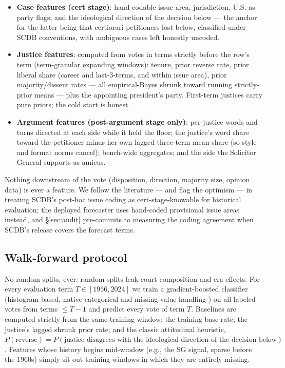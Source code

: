 \documentclass[11pt]{article}
\begin{document}
\begin{itemize}
\item \textbf{Case features (cert stage)}: hand-codable issue area,
  jurisdiction, U.S.-as-party flags, and the ideological direction of the
  decision below --- the anchor for the latter being that certiorari petitioners
  lost below, classified under SCDB conventions, with ambiguous cases left
  honestly uncoded.
\item \textbf{Justice features}: computed from votes in terms strictly before
  the row's term (term-granular expanding windows): tenure, prior reverse rate,
  prior liberal share (career and last-3-terms, and within issue area), prior
  majority/dissent rates --- all empirical-Bayes shrunk toward running
  strictly-prior means --- plus the appointing president's party. First-term
  justices carry pure priors; the cold start is honest.
\item \textbf{Argument features (post-argument stage only)}: per-justice words
  and turns directed at each side while it held the floor; the justice's word
  share toward the petitioner minus her own lagged three-term mean share (so
  style and format norms cancel); bench-wide aggregates; and the side the
  Solicitor General supports as amicus.
\end{itemize}

Nothing downstream of the vote (disposition, direction, majority size, opinion
data) is ever a feature. We follow the literature --- and flag the optimism ---
in treating SCDB's post-hoc issue coding as cert-stage-knowable for historical
evaluation; the deployed forecaster uses hand-coded provisional issue areas
instead, and \S\ref{sec:audit} pre-commits to measuring the coding agreement
when SCDB's release covers the forecast terms.

\subsection{Walk-forward protocol}

No random splits, ever: random splits leak court composition and era effects.
For every evaluation term $T \in [1956, 2024]$ we train a gradient-boosted
classifier (histogram-based, native categorical and missing-value handling
\citep{pedregosa2011}) on all labeled votes from terms $\le T{-}1$ and predict
every vote of term $T$. Baselines are computed strictly from the same training
window: the training base rate; the justice's lagged shrunk prior rate; and the
classic attitudinal heuristic, $P(\text{reverse}) = P(\text{justice disagrees
with the ideological direction of the decision below})$. Features whose history
begins mid-window (e.g., the SG signal, sparse before the 1960s) simply sit out
training windows in which they are entirely missing.
\end{document}
